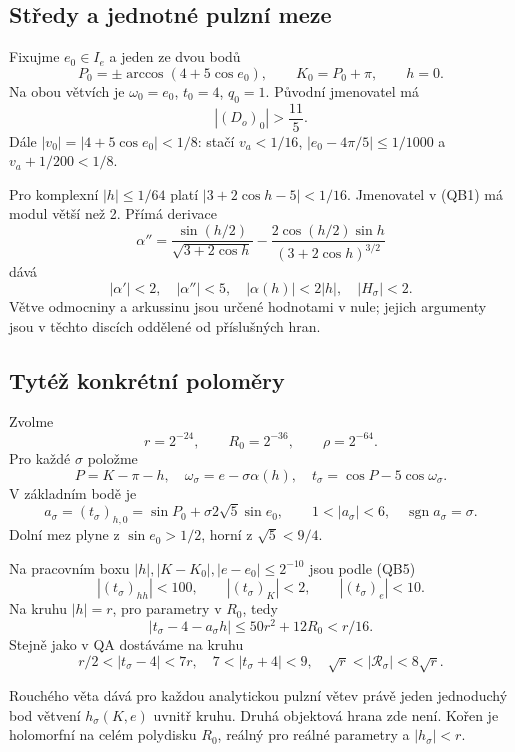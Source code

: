 \documentclass[11pt,a4paper]{article}
\theoremstyle{remark}\newtheorem{remark}[theorem]{Poznámka}
\numberwithin{equation}{section}
\begin{document}
\hypertarget{stux159edy-a-jednotnuxe9-pulznuxed-meze}{%
\subsection{Středy a jednotné pulzní
meze}\label{stux159edy-a-jednotnuxe9-pulznuxed-meze}}

Fixujme \(e_0\in I_e\) a jeden ze dvou bodů \[
P_0=\pm\arccos(4+5\cos e_0),\qquad K_0=P_0+\pi,\qquad h=0.
\] Na obou větvích je \(\omega_0=e_0\), \(t_0=4\), \(q_0=1\). Původní
jmenovatel má \[
\boxed{|(D_o)_0|>\frac{11}{5}.}
\tag{QB4}
\] Dále \(|v_0|=|4+5\cos e_0|<1/8\): stačí \(v_a<1/16\),
\(|e_0-4\pi/5|\le1/1000\) a \(v_a+1/200<1/8\).

Pro komplexní \(|h|\le1/64\) platí \(|3+2\cos h-5|<1/16\). Jmenovatel v
(QB1) má modul větší než 2. Přímá derivace \[
\alpha''=
\frac{\sin(h/2)}{\sqrt{3+2\cos h}}
-\frac{2\cos(h/2)\sin h}{(3+2\cos h)^{3/2}}
\] dává \[
\boxed{|\alpha'|<2,\quad |\alpha''|<5,\quad
|\alpha(h)|<2|h|,\quad |H_\sigma|<2.}
\tag{QB5}
\] Větve odmocniny a arkussinu jsou určené hodnotami v nule; jejich
argumenty jsou v těchto discích oddělené od příslušných hran.

\hypertarget{tytuxe9ux17e-konkruxe9tnuxed-polomux11bry}{%
\subsection{Tytéž konkrétní
poloměry}\label{tytuxe9ux17e-konkruxe9tnuxed-polomux11bry}}

Zvolme \[
\boxed{r=2^{-24},\qquad R_0=2^{-36},\qquad \rho=2^{-64}.}
\tag{QB6}
\] Pro každé \(\sigma\) položme \[
P=K-\pi-h,\quad \omega_\sigma=e-\sigma\alpha(h),\quad
t_\sigma=\cos P-5\cos\omega_\sigma.
\] V základním bodě je \[
a_\sigma=(t_\sigma)_{h,0}
=\sin P_0+\sigma2\sqrt5\sin e_0,\qquad
1<|a_\sigma|<6,\quad \operatorname{sgn}a_\sigma=\sigma.
\tag{QB7}
\] Dolní mez plyne z \(\sin e_0>1/2\), horní z \(\sqrt5<9/4\).

Na pracovním boxu \(|h|,|K-K_0|,|e-e_0|\le2^{-10}\) jsou podle (QB5) \[
|(t_\sigma)_{hh}|<100,\qquad
|(t_\sigma)_K|<2,\qquad |(t_\sigma)_e|<10.
\] Na kruhu \(|h|=r\), pro parametry v \(R_0\), tedy \[
|t_\sigma-4-a_\sigma h|
\le50r^2+12R_0<r/16.
\tag{QB8}
\] Stejně jako v QA dostáváme na kruhu \[
r/2<|t_\sigma-4|<7r,\quad
7<|t_\sigma+4|<9,\quad
\sqrt r<|\mathcal R_\sigma|<8\sqrt r.
\tag{QB9}
\]

Rouchého věta dává pro každou analytickou pulzní větev právě jeden
jednoduchý bod větvení \(h_\sigma(K,e)\) uvnitř kruhu. Druhá objektová
hrana zde není. Kořen je holomorfní na celém polydisku \(R_0\), reálný
pro reálné parametry a \(|h_\sigma|<r\).
\end{document}
